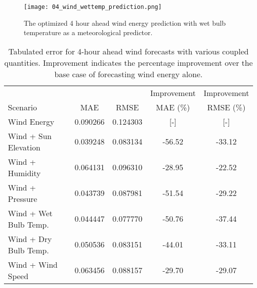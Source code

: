 \begin{figure*}[!ht]
  \centering
  \texttt{[image: 04\_wind\_wettemp\_prediction.png]}
  \caption{The optimized 4 hour ahead wind energy prediction with wet bulb
  temperature as a meteorological predictor.}
  \label{fig:wind04}
\end{figure*}
  \begin{table*}[!ht]
    \centering
    \caption{Tabulated error for 4-hour ahead wind forecasts with various coupled quantities. Improvement indicates the percentage improvement over the base case of forecasting wind energy alone.}
    \label{tab:wind04}
    \begin{tabular}{l|c|c|c|c}
      &  & & Improvement & Improvement \\
      Scenario  & MAE & RMSE & MAE (\%) & RMSE (\%)\\
      \hline
      Wind Energy & 0.090266 & 0.124303 & [-] & [-] \\
      Wind + Sun Elevation & 0.039248 & 0.083134 & -56.52& -33.12\\
      Wind + Humidity & 0.064131 & 0.096310 & -28.95& -22.52\\
      Wind + Pressure & 0.043739 & 0.087981 & -51.54& -29.22\\
      Wind + Wet Bulb Temp. & 0.044447 & 0.077770 & -50.76& -37.44\\
      Wind + Dry Bulb Temp. & 0.050536 & 0.083151 & -44.01 & -33.11\\
      Wind + Wind Speed & 0.063456 & 0.088157 & -29.70 & -29.07\\
    \end{tabular}
  \end{table*}
